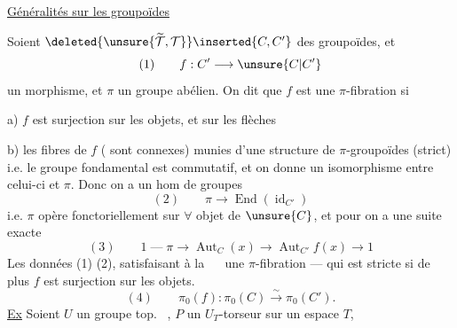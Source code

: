 \uline{Généralités sur les groupoïdes}

Soient $\deleted{\unsure{\widetilde{\mathcal T},\mathcal T}}\inserted{C,C'}$ des groupoïdes, et
\[(1)\qquad f:C'\longrightarrow\unsure{C|C'}\]
un morphisme, et $\pi$ un groupe abélien.
On dit que $f$ est une $\pi$-fibration  si

a) $f$ est  surjection  sur les objets, et  sur les flèches

b) les fibres de $f$ ( sont connexes)  munies d'une structure de $\pi$-groupoïdes (strict) i.e. le groupe fondamental est commutatif, et on donne un isomorphisme entre celui-ci et $\pi$.
Donc on a un hom de groupes
\[(2)\qquad\pi\longrightarrow\operatorname{End}(\operatorname{id}_{C'})\]
i.e. $\pi$ opère fonctoriellement sur $\forall$ objet de $\unsure{C}$, et pour  on a une suite exacte
\[(3)\qquad1\;\text{---}\;\pi\longrightarrow\operatorname{Aut}_C(x)\longrightarrow\operatorname{Aut}_{C'}f(x)\longrightarrow1\]
Les données (1) (2), satisfaisant à la \ \  une $\pi$-fibration --- qui est stricte si de plus $f$ est surjection sur les objets.
\[(4)\qquad\pi_0(f):\pi_0(C)\xrightarrow{\sim}\pi_0(C').\]
\uline{Ex} Soient $U$ un groupe top. \ , $P$ un $U_T$-torseur sur un espace $T$,
